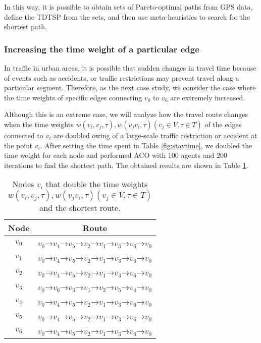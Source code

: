 \documentclass[conference]{IEEEtran}
\begin{document}
\par In this way, it is possible to obtain sets of Pareto-optimal paths from GPS data, define the TDTSP from the sets, and then use meta-heuristics to search for the shortest path.

\subsubsection{Increasing the time weight of a particular edge}
\par In traffic in urban areas, it is possible that sudden changes in travel time because of events such as accidents, or traffic restrictions may prevent travel along a particular segment.
Therefore, as the next case study, we consider the case where the time weights of specific edges connecting $v_0$ to $v_6$ are extremely increased.
\par Although this is an extreme case, we will analyze how the travel route changes when the time weights $w(v_i, v_j, \tau), w(v_j v_i, \tau) (v_j \in V , \tau \in T)$ of the edges connected to $v_i$ are doubled owing of a large-scale traffic restriction or accident at the point $v_i$.
After setting the time spent in Table \ref{fig:staytime}, we doubled the time weight for each node and performed ACO with 100 agents and 200 iterations to find the shortest path.
The obtained results are shown in Table \ref{fig:each_ver_weigh}.

\begin{table}[h]
 \begin{center}
   \caption{Nodes $v_i$ that double the time weights $w(v_i, v_j, \tau), w(v_j v_i, \tau) (v_j \in V , \tau \in T)$ and the shortest route.}
   \begin{tabular}{|c||c|} \hline
   Node & Route \\ \hline \hline
   $v_0$ & $v_0$→$v_4$→$v_5$→$v_2$→$v_1$→$v_3$→$v_6$→$v_0$ \\ \hline
   $v_1$ & $v_0$→$v_4$→$v_5$→$v_2$→$v_1$→$v_3$→$v_6$→$v_0$ \\ \hline
   $v_2$ & $v_0$→$v_4$→$v_5$→$v_2$→$v_1$→$v_3$→$v_6$→$v_0$\\ \hline
   $v_3$ & $v_0$→$v_6$→$v_3$→$v_1$→$v_2$→$v_5$→$v_4$→$v_0$\\ \hline
   $v_4$ & $v_0$→$v_4$→$v_5$→$v_2$→$v_1$→$v_3$→$v_6$→$v_0$ \\ \hline
   $v_5$ & $v_0$→$v_4$→$v_5$→$v_2$→$v_1$→$v_3$→$v_6$→$v_0$\\ \hline
   $v_6$ & $v_0$→$v_4$→$v_5$→$v_2$→$v_1$→$v_3$→$v_6$→$v_0$\\ \hline
  \end{tabular}
  \label{fig:each_ver_weigh}
 \end{center}
\end{table}
\end{document}
